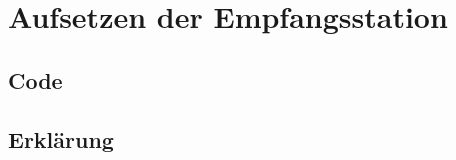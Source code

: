 \chapter{Aufsetzen der Empfangsstation}
\label{chap:gs-setup}

\section{Code}

\section{Erklärung}

